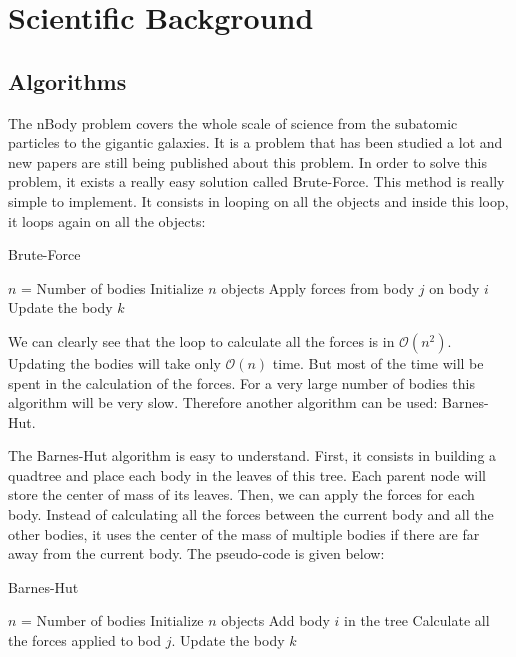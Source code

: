 \documentclass[11pt,a4paper]{article}
\begin{document}



\ppabstract{}

\section{Scientific Background}
\subsection{Algorithms}

The nBody problem covers the whole scale of science from the subatomic particles to the gigantic galaxies. It is a problem that has been studied a lot and new papers are still being published about this problem. In order to solve this problem, it exists a really easy solution called Brute-Force. This method is really simple to implement. It consists in looping on all the objects and inside this loop, it loops again on all the objects:
\begin{algorithm}
\caption{Brute-Force}\label{bf}
\begin{algorithmic}[1]
\State $n$ = Number of bodies
\State Initialize $n$ objects
\State Apply forces from body $j$ on body $i$
\EndFor
\EndFor
{}
\State Update the body $k$
\EndFor
\EndWhile
\end{algorithmic}
\end{algorithm}

We can clearly see that the loop to calculate all the forces is in $\mathcal{O}(n^2)$. Updating the bodies will take only $\mathcal{O}(n)$ time. But most of the time will be spent in the calculation of the forces. For a very large number of bodies this algorithm will be very slow. Therefore another algorithm can be used: Barnes-Hut.

The Barnes-Hut algorithm is easy to understand. First, it consists in building a quadtree and place each body in the leaves of this tree. Each parent node will store the center of mass of its leaves. Then, we can apply the forces for each body. Instead of calculating all the forces between the current body and all the other bodies, it uses the center of the mass of multiple bodies if there are far away from the current body. The pseudo-code is given below:
\begin{algorithm}
\caption{Barnes-Hut}\label{bh}
\begin{algorithmic}[1]
\State $n$ = Number of bodies
\State Initialize $n$ objects
\State	Add body $i$ in the tree
\EndFor
{} 
\State	Calculate all the forces applied to bod $j$.
\EndFor	
{}
\State Update the body $k$
\EndFor
\EndWhile
\end{algorithmic}
\end{algorithm}
\end{document}
